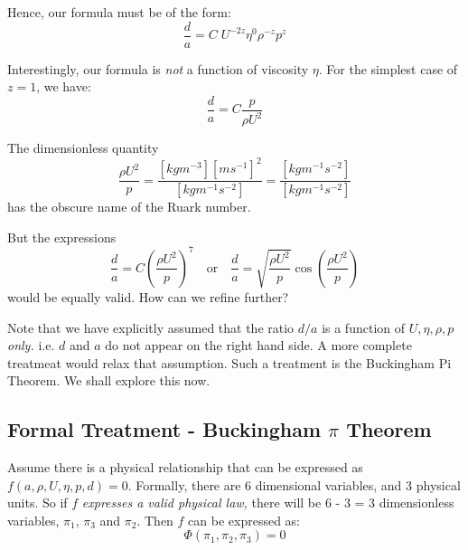 \documentclass[a4paper]{report}
\begin{document}
Hence, our formula must be of the form:
\begin{equation}
\frac{d}{a} = C \; U^{-2z} \eta^{0} \rho^{-z} p^{z}
\end{equation}

Interestingly, our formula is \emph{not} a function of viscosity $\eta$.
For the simplest case of $z=1$, we have:
\begin{equation}
\frac{d}{a} = C \frac{p}{\rho U^2}
\end{equation}

The dimensionless quantity
\begin{equation}
 \frac{\rho U^2}{p} = \frac{[kg m^{-3}] [m s^{-1}]^2}{[kg m^{-1} s^{-2}]} = \frac{[kg m^{-1} s^{-2}]}{[kg m^{-1} s^{-2}]} 
\end{equation}
has the obscure name of the Ruark number.

\vspace*{1em}
But the expressions
\begin{equation}
\frac{d}{a} = C \left( \frac{\rho U^2}{p} \right)^7
\quad \text{or} \quad
\frac{d}{a} = \sqrt{ \frac{\rho U^2}{p} } \cos \left( \frac{\rho U^2}{p} \right)
\end{equation}
would be equally valid.  How can we refine further?

\vspace{1em}
Note that we have explicitly assumed that the ratio $d/a$ is a function of $U, \eta, \rho, p$ \emph{only.} i.e. $d$ and $a$ do not appear on the right hand side. A more complete treatmeat would relax that assumption.  Such a treatment is the Buckingham Pi Theorem.  We shall explore this now.

\pagebreak

\subsection*{Formal Treatment - Buckingham $\pi$ Theorem }

Assume there is a physical relationship that can be expressed as $f(a,\rho ,U,\eta, p, d) = 0 $.
Formally, there are 6 dimensional variables, and 3 physical units.
So if $f$ \emph{expresses a valid physical law,} there will be 
6 - 3 = 3 dimensionless variables, $\pi_1$, $\pi_3$ and $\pi_2$.
Then $f$ can be expressed as:
\begin{equation}
\Phi (\pi_1,\pi_2,\pi_3) = 0
\end{equation}

%
%
\end{document}
